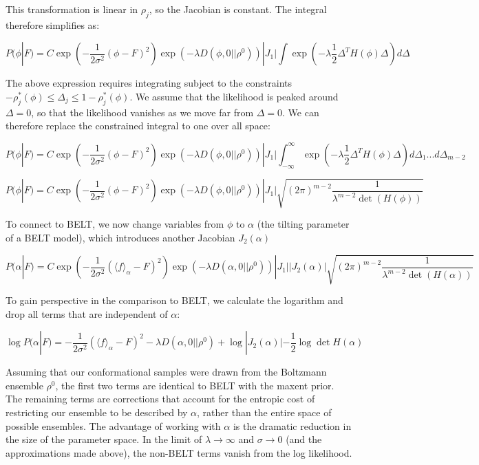 \documentclass[12pt]{article}
\begin{document}
This transformation is linear in $\rho_j$, so the Jacobian is constant.  The integral therefore simplifies as:

$$P(\phi | F) = C \exp(-\frac{1}{2\sigma^2} (\phi - F)^2) \exp(-\lambda  D(\phi, 0|| \rho^0)) |J_1|  \int   \exp(-\lambda \frac{1}{2} \Delta^T H(\phi) \Delta) d\Delta $$

The above expression requires integrating subject to the constraints $-\rho_j^*(\phi) \le \Delta_j \le 1 - \rho_j^*(\phi)$.  We assume that the likelihood is peaked around $\Delta=0$, so that the likelihood vanishes as we move far from $\Delta = 0$.  We can therefore replace the constrained integral to one over all space:

$$P(\phi | F) = C \exp(-\frac{1}{2\sigma^2} (\phi - F)^2) \exp(-\lambda  D(\phi, 0|| \rho^0)) |J_1|  \int_{-\infty}^\infty   \exp(-\lambda \frac{1}{2} \Delta^T H(\phi) \Delta) d\Delta_1 ... d\Delta_{m-2}$$


$$P(\phi | F) = C \exp(-\frac{1}{2\sigma^2} (\phi - F)^2) \exp(-\lambda  D(\phi, 0|| \rho^0)) |J_1|  \sqrt{(2\pi)^{m-2} \frac{1}{\lambda^{m-2} \det (H(\phi))}}  $$

To connect to BELT, we now change variables from $\phi$ to $\alpha$ (the tilting parameter of a BELT model), which introduces another Jacobian $J_2(\alpha)$

$$P(\alpha | F) = C \exp(-\frac{1}{2\sigma^2} (\langle f \rangle_\alpha - F)^2) \exp(-\lambda  D(\alpha, 0|| \rho^0)) |J_1|  |J_2(\alpha)|  \sqrt{(2\pi)^{m-2} \frac{1}{\lambda^{m-2} \det (H(\alpha))}}$$

To gain perspective in the comparison to BELT, we calculate the logarithm and drop all terms that are independent of $\alpha$:

$$\log P(\alpha | F) = -\frac{1}{2\sigma^2} (\langle f \rangle_\alpha - F)^2 -\lambda  D(\alpha, 0|| \rho^0) + \log |J_2(\alpha)| - \frac{1}{2} \log \det H(\alpha)$$

Assuming that our conformational samples were drawn from the Boltzmann ensemble $\rho^0$, the first two terms are identical to BELT with the maxent prior.  The remaining terms are corrections that account for the entropic cost of restricting our ensemble to be described by $\alpha$, rather than the entire space of possible ensembles.  The advantage of working with $\alpha$ is the dramatic reduction in the size of the parameter space.  In the limit of $\lambda \rightarrow \infty$ and $\sigma \rightarrow 0$ (and the approximations made above), the non-BELT terms vanish from the log likelihood.  
\end{document}
